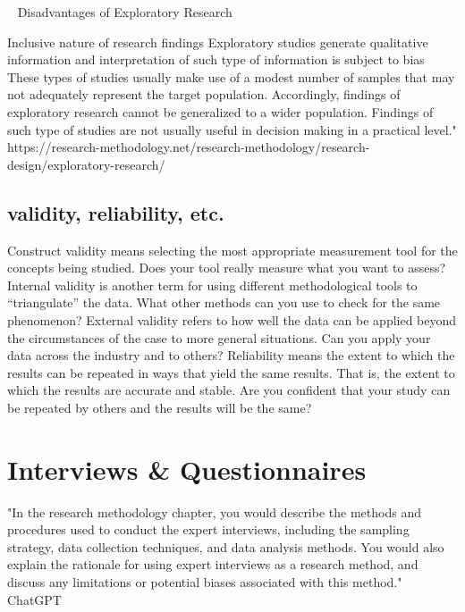  
Disadvantages of Exploratory Research

    Inclusive nature of research findings
    Exploratory studies generate qualitative information and interpretation of such type of information is subject to bias
    These types of studies usually make use of a modest number of samples that may not adequately represent the target population. Accordingly, findings of exploratory research cannot be generalized to a wider population.
    Findings of such type of studies are not usually useful in decision making in a practical level."
    https://research-methodology.net/research-methodology/research-design/exploratory-research/


\subsection{validity, reliability, etc.}

Construct validity means selecting the most appropriate measurement tool for the concepts
being studied. Does your tool really measure what you want to assess?
Internal validity is another term for using different methodological tools to “triangulate” the
data. What other methods can you use to check for the same phenomenon?
External validity refers to how well the data can be applied beyond the circumstances of the
case to more general situations. Can you apply your data across the industry and to others?
Reliability means the extent to which the results can be repeated in ways that yield the same
results. That is, the extent to which the results are accurate and stable. Are you confident that
your study can be repeated by others and the results will be the same?



\section{Interviews & Questionnaires}
"In the research methodology chapter, you would describe the methods and procedures used to conduct the expert interviews, including the sampling strategy, data collection techniques, and data analysis methods. You would also explain the rationale for using expert interviews as a research method, and discuss any limitations or potential biases associated with this method." ChatGPT


